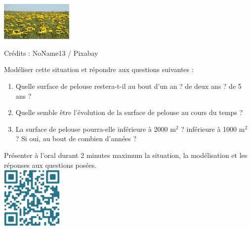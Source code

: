 \documentclass[a4paper,12pt,exos]{nsi}
\begin{document}
    \maketitle


{
    \includegraphics[width=3.5cm]{dandelion.jpg}

    \tiny{Crédits : NoName13 / Pixabay}
}

Modéliser cette situation et répondre aux questions suivantes :
\begin{enumerate}[label=\textbullet]
    \item Quelle surface de pelouse restera-t-il au bout d'un an ? de deux ans ? de 5 ans ?
    \item Quelle semble être l'évolution de la surface de pelouse au cours du temps ?
    \item La surface de pelouse pourra-elle inférieure à 2000 m$^2$ ? inférieure à 1000 m$^2$ ? Si oui, au bout de combien d'années ?
\end{enumerate}

Présenter à l’oral durant 2 minutes maximum la situation, la modélisation et les réponses aux questions posées.\\

    {\includegraphics[width=3cm]{code-qr.png}}
\end{document}
